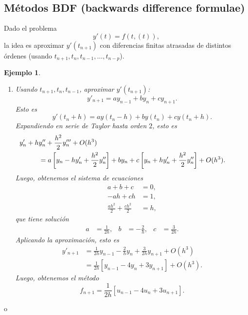 \documentclass[11pt,letterpaper]{article}
\newtheorem{example}{Ejemplo}
\begin{document}
\subsection{Métodos BDF (backwards difference formulae)}

Dado el problema
\begin{equation}
  y'(t)=f(t,(t))
,\end{equation}
la idea es aproximar $y'(t_{n+1})$ con diferencias finitas atrasadas
de distintos órdenes (usando $t_{n+1},t_{n},t_{n-1},\dots,t_{n-p}$).

\begin{example}
  \begin{enumerate}
    \item
      Usando $t_{n+1},t_{n},t_{n-1}$, aproximar $y'(t_{n+1})$:
      \begin{equation}
        y'_{n+1} = ay_{n-1} + by_{n} + cy_{n+1}
      .\end{equation}
      Esto es
      \begin{equation}
        y'(t_{n}+h)
        = ay(t_{n}-h) + by(t_{n}) + cy(t_n+h)
      .\end{equation}
      Expandiendo en serie de Taylor hasta orden $2$, esto es
      \begin{align}
        &\hspace{-10mm}
        y'_n + hy''_n + \frac{h^{2}}{2}y'''_n + O(h^{3}) \\
        &= a \left[y_n - h y'_n + \frac{h^{2}}{2}y''_n\right]
        + b y_n
        + c \left[y_n + hy'_n + \frac{h^{2}}{2}y''_n\right]
        + O(h^{3})
      .\end{align}
      Luego, obtenemos el sistema de ecuaciones
      \begin{align}
        a+b+c &= 0, \\
        -ah+ch &= 1, \\
        \frac{ah^{2}}{2} + \frac{ch^{2}}{2} &= h,
      \end{align}
      que tiene solución
      \begin{align}
        a &= \frac{1}{2h}, &
        b &= -\frac{2}{h}, &
        c &= \frac{3}{2h}.
      \end{align}
      Aplicando la aproximación, esto es
      \begin{align}
        y'_{n+1}
        &= \frac{1}{2h}y_{n-1} - \frac{2}{h}y_n + \frac{3}{2h}y_{n+1}
        + O(h^{3})
        \\
        &= \frac{1}{2h}[y_{n-1} - 4y_n + 3y_{n+1}] + O(h^{3})
      .\end{align}
      Luego, obtenemos el método
      \begin{equation}
        f_{n+1} = \frac{1}{2h}[u_{n-1} - 4u_n + 3u_{n+1}]
      .\end{equation}
  \end{enumerate}
\end{example}o
\end{document}

